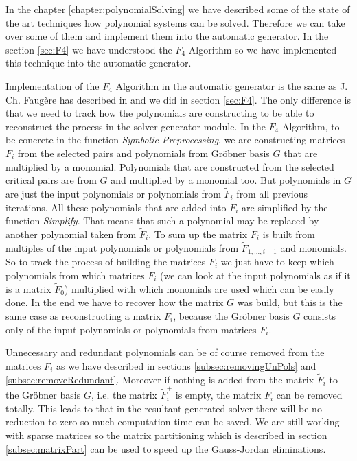In the chapter \ref{chapter:polynomialSolving} we have described some of the state of the art techniques how polynomial systems can be solved. Therefore we can take over some of them and implement them into the automatic generator. In the section \ref{sec:F4} we have understood the $F_4$ \cite{F4} Algorithm so we have implemented this technique into the automatic generator.

Implementation of the $F_4$ Algorithm in the automatic generator is the same as J. Ch. Faug\`ere has described in \cite{F4} and we did in section \ref{sec:F4}. The only difference is that we need to track how the polynomials are constructing to be able to reconstruct the process in the solver generator module. In the $F_4$ Algorithm, to be concrete in the function \textit{Symbolic Preprocessing}, we are constructing matrices $F_i$ from the selected pairs and polynomials from Gr\"obner basis $G$ that are multiplied by a monomial. Polynomials that are constructed from the selected critical pairs are from $G$ and multiplied by a monomial too. But polynomials in $G$ are just the input polynomials or polynomials from $\tilde{F}_i$ from all previous iterations. All these polynomials that are added into $F_i$ are simplified by the function \textit{Simplify}. That means that such a polynomial may be replaced by another polynomial taken from $\tilde{F}_i$. To sum up the matrix $F_i$ is built from multiples of the input polynomials or polynomials from $\tilde{F}_{1,\dots, i-1}$ and monomials. So to track the process of building the matrices $F_i$ we just have to keep which polynomials from which matrices $\tilde{F}_i$ (we can look at the input polynomials as if it is a matrix $\tilde{F}_0$) multiplied with which monomials are used which can be easily done. In the end we have to recover how the matrix $G$ was build, but this is the same case as reconstructing a matrix $F_i$, because the Gr\"obner basis $G$ consists only of the input polynomials or polynomials from matrices $\tilde{F}_i$.

Unnecessary and redundant polynomials can be of course removed from the matrices $F_i$ as we have described in sections \ref{subsec:removingUnPols} and \ref{subsec:removeRedundant}. Moreover if nothing is added from the matrix $\tilde{F}_i$ to the Gr\"obner basis $G$, i.e. the matrix $\tilde{F}_i^+$ is empty, the matrix $F_i$ can be removed totally. This leads to that in the resultant generated solver there will be no reduction to zero so much computation time can be saved. We are still working with sparse matrices so the matrix partitioning which is described in section \ref{subsec:matrixPart} can be used to speed up the Gauss-Jordan eliminations.


